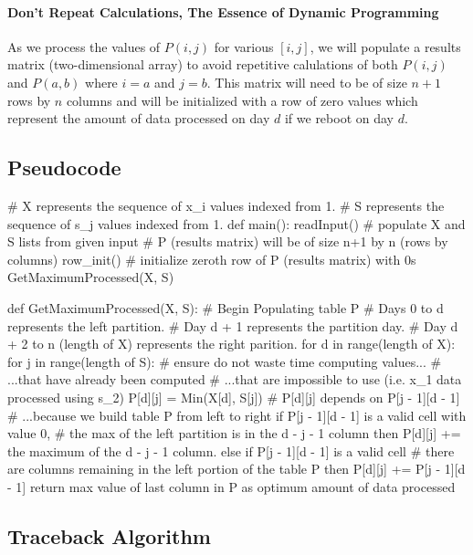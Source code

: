 \documentclass[12pt]{article}
\begin{document}
\paragraph{Don't Repeat Calculations, The Essence of Dynamic Programming}
As we process the values of $P(i, j)$ for various $[i, j]$, we will populate a results matrix (two-dimensional array) to avoid repetitive calulations of both $P(i, j)$ and $P(a, b)$ where $i = a$ and $j = b$.
This matrix will need to be of size $n+1$ rows by $n$ columns and will be initialized with a row of zero values which represent the amount of data processed on day $d$ if we reboot on day $d$.
\subsection{Pseudocode}
\begin{verbatimtab}[4]
# X represents the sequence of x_i values indexed from 1.
# S represents the sequence of s_j values indexed from 1.
def main():
	readInput()	# populate X and S lists from given input
	# P (results matrix) will be of size n+1 by n (rows by columns)
	row_init()	# initialize zeroth row of P (results matrix) with 0s
	GetMaximumProcessed(X, S)

def GetMaximumProcessed(X, S):
	# Begin Populating table P
	# Days 0 to d represents the left partition.
	# Day d + 1 represents the partition day.
	# Day d + 2 to n (length of X) represents the right parition.
	for d in range(length of X):
		for j in range(length of S):
			# ensure do not waste time computing values...
			# ...that have already been computed
			# ...that are impossible to use (i.e. x_1 data processed using s_2)
			P[d][j] = Min(X[d], S[j])
			# P[d][j] depends on P[j - 1][d - 1]
			# ...because we build table P from left to right
			if P[j - 1][d - 1] is a valid cell with value 0,
				# the max of the left partition is in the d - j - 1 column
				then P[d][j] += the maximum of the d - j - 1 column.
			else if  P[j - 1][d - 1] is a valid cell
				# there are columns remaining in the left portion of the table P
				then P[d][j] += P[j - 1][d - 1]
	return max value of last column in P as optimum amount of data processed

\end{verbatimtab}
\subsection{Traceback Algorithm}
\end{document}
